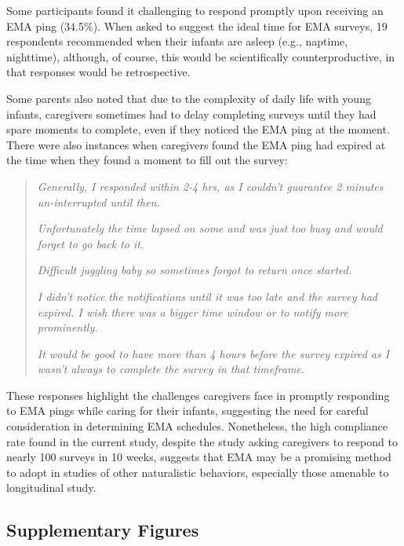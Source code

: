 \documentclass[
]{article}
\begin{document}
Some participants found it challenging to respond promptly upon
receiving an EMA ping (34.5\%). When asked to suggest the ideal time for
EMA surveys, 19 respondents recommended when their infants are asleep
(e.g., naptime, nighttime), although, of course, this would be
scientifically counterproductive, in that responses would be
retrospective.

Some parents also noted that due to the complexity of daily life with
young infants, caregivers sometimes had to delay completing surveys
until they had spare moments to complete, even if they noticed the EMA
ping at the moment. There were also instances when caregivers found the
EMA ping had expired at the time when they found a moment to fill out
the survey:

\begin{quote}
\textit{Generally, I responded within 2-4 hrs, as I couldn't guarantee 2 minutes un-interrupted until then.}
  
\textit{Unfortunately the time lapsed on some and was just too busy and would forget to go back to it.}
  
\textit{Difficult juggling baby so sometimes forgot to return once started.}
  
\textit{I didn’t notice the notifications until it was too late and the survey had expired. I wish there was a bigger time window or to notify more prominently.}
  
\textit{It would be good to have more than 4 hours before the survey expired as I wasn't always to complete the survey in that timeframe.}
  
\end{quote}

These responses highlight the challenges caregivers face in promptly
responding to EMA pings while caring for their infants, suggesting the
need for careful consideration in determining EMA schedules.
Nonetheless, the high compliance rate found in the current study,
despite the study asking caregivers to respond to nearly 100 surveys in
10 weeks, suggests that EMA may be a promising method to adopt in
studies of other naturalistic behaviors, especially those amenable to
longitudinal study.

\clearpage

\subsection*{Supplementary Figures}\label{supplementary-figures}
\end{document}

